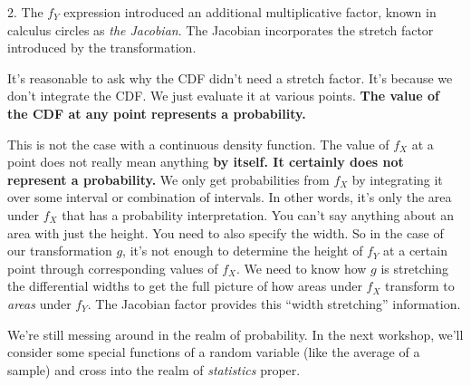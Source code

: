 \documentclass[]{article}
\begin{document}
2. The $f_Y$ expression introduced an additional multiplicative
   factor, known in calculus circles as \emph{the Jacobian}.  The
   Jacobian incorporates the stretch factor introduced by the
   transformation.

It's reasonable to ask why the CDF didn't need a stretch factor.
It's because we don't integrate the CDF.  We just evaluate it at
various points.
\textbf{The value of the CDF at any point represents a probability.}

This is not the case with a continuous density function.  The
value of $f_X$ at a point does not really mean anything
\textbf{by itself.
It certainly does not represent a probability.}  We only get
probabilities from $f_X$ by integrating it over some interval
or combination of intervals.  In other words, it's only the
area under $f_X$ that has a probability interpretation.  You
can't say anything about an area with just the height.  You
need to also specify the width.  So in the case of our transformation
$g$, it's not enough to determine the height of $f_Y$ at a certain
point through corresponding values of $f_X$.  We need to know how
$g$ is stretching the differential widths to get the full picture
of how areas under $f_X$ transform to \emph{areas} under $f_Y$.  The
Jacobian factor provides this ``width stretching'' information.

We're still messing around in the realm of probability.  In the next
workshop, we'll consider some special functions of a random
variable (like the average of a sample) and cross into the
realm of \emph{statistics} proper.
\end{document}
